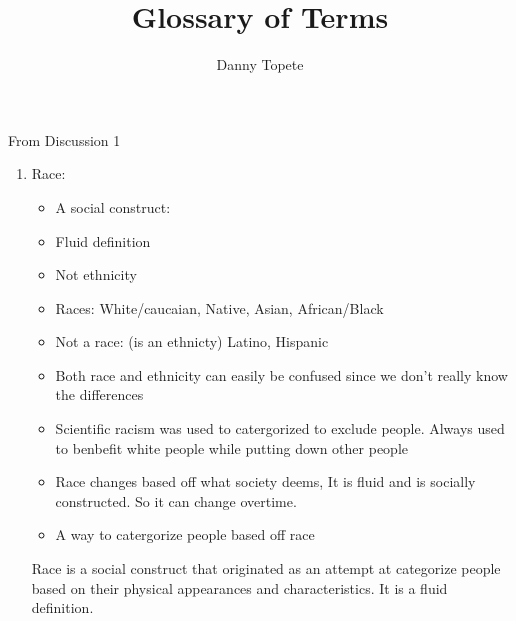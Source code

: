 \documentclass{article}
\title{Glossary of Terms}
\author{Danny Topete}
\begin{document}
  
\maketitle

From Discussion 1
\begin{enumerate}
  \item Race:
    \begin{itemize}
      \item A social construct:
      \item Fluid  definition
      \item Not ethnicity
      \item Races:
        White/caucaian, Native, Asian, African/Black
      \item Not a race: (is an ethnicty)
        Latino, Hispanic
      \item Both race and ethnicity can easily be confused since we don't 
        really know the differences
      \item Scientific racism was used to catergorized
        to exclude people.
        Always used to benbefit white people while putting
        down other people
      \item Race changes based off what society deems,
        It is fluid and is socially constructed. 
        So it can change overtime.
      \item A way to catergorize people based off race
    \end{itemize}
    Race is a social construct that originated
    as an attempt at categorize people 
    based on their physical appearances and
    characteristics. It is a fluid definition.


\end{enumerate}
\end{document}
